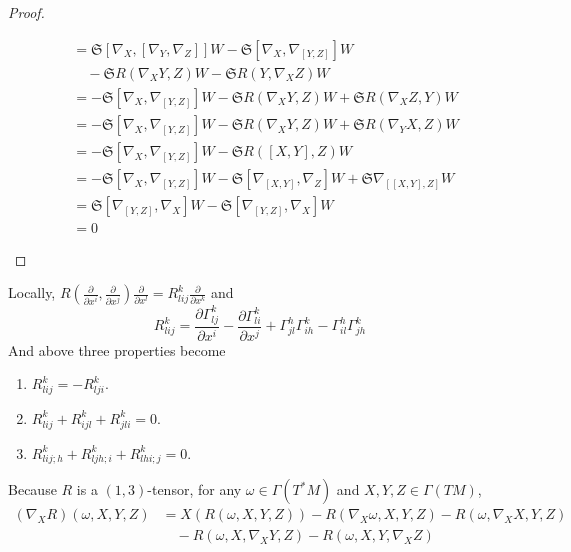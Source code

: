 \begin{enumerate}[label=\arabic{*}.]
\begin{proof}
\begin{enumerate}[label=(\arabic{*})]
\begin{equation*}
\begin{aligned}
					&= \mathfrak{S}[\nabla_X,[\nabla_Y,\nabla_Z]]W - \mathfrak{S}[\nabla_X,\nabla_{[Y,Z]}]W \\
					&\quad - \mathfrak{S}R(\nabla_XY,Z)W -\mathfrak{S}R(Y,\nabla_XZ)W \\
					&=- \mathfrak{S}[\nabla_X,\nabla_{[Y,Z]}]W- \mathfrak{S}R(\nabla_XY,Z)W +\mathfrak{S}R(\nabla_XZ,Y)W \\
					&= - \mathfrak{S}[\nabla_X,\nabla_{[Y,Z]}]W- \mathfrak{S}R(\nabla_XY,Z)W +\mathfrak{S}R(\nabla_YX,Z)W \\
					&= - \mathfrak{S}[\nabla_X,\nabla_{[Y,Z]}]W - \mathfrak{S}R([X,Y],Z)W \\
					&= - \mathfrak{S}[\nabla_X,\nabla_{[Y,Z]}]W - \mathfrak{S}[\nabla_{[X,Y]},\nabla_Z]W+ \mathfrak{S}\nabla_{[[X,Y],Z]}W \\
					&= \mathfrak{S}[\nabla_{[Y,Z]},\nabla_X]W - \mathfrak{S}[\nabla_{[Y,Z]},\nabla_X]W \\
					&= 0
				\end{aligned}
			\end{equation*}
		\end{enumerate}
	\end{proof}
	\begin{rmk}
		Locally, $R(\frac{\partial}{\partial x^i},\frac{\partial}{\partial x^j})\frac{\partial}{\partial x^l} = R^k_{lij}\frac{\partial}{\partial x^k}$ and
		\begin{equation*}
			R^k_{lij} = \frac{\partial \Gamma^k_{lj}}{\partial x^i} - \frac{\partial \Gamma^k_{li}}{\partial x^j} + \Gamma^h_{jl}\Gamma^k_{ih}-\Gamma^h_{il}\Gamma^k_{jh}
		\end{equation*}
		And above three properties become
		\begin{enumerate}[label=(\arabic{*})]
			\item $R^k_{lij} = -R^k_{lji}$.
			\item $R^k_{lij}+R^k_{ijl}+R^k_{jli}=0$.
			\item $R^k_{lij;h}+R^k_{ljh;i}+R^k_{lhi;j}=0$.
		\end{enumerate}
	\end{rmk}
	\begin{rmk}
		Because $R$ is a $(1,3)$-tensor, for any $\omega \in \Gamma(T^*M)$ and $X,Y,Z \in \Gamma(TM)$,
		\begin{equation*}
			\begin{aligned}
				(\nabla_XR)(\omega,X,Y,Z) &= X(R(\omega,X,Y,Z)) - R(\nabla_X\omega,X,Y,Z)- R(\omega,\nabla_XX,Y,Z) \\
				&\quad- R(\omega,X,\nabla_XY,Z)- R(\omega,X,Y,\nabla_XZ)

\end{aligned}
\end{equation*}
\end{rmk}
\end{enumerate}
